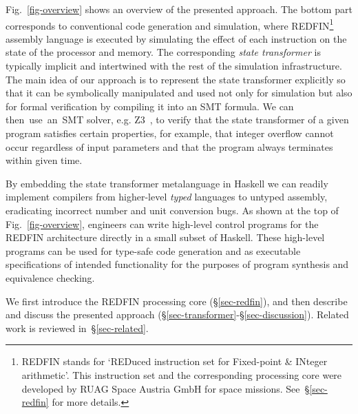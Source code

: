 Fig.~\ref{fig-overview} shows an overview of the presented approach. The bottom
part corresponds to conventional code generation and simulation, where
REDFIN\footnote{REDFIN stands for `REDuced instruction set for Fixed-point \&
INteger arithmetic'. This instruction set and the corresponding processing core
were developed by RUAG Space Austria GmbH for space missions.
See~\S\ref{sec-redfin} for more details.} assembly language is executed by
simulating the effect of each instruction on the state of the processor and memory.
The corresponding \emph{state transformer} is typically implicit and intertwined
with the rest of the simulation infrastructure. The main idea of our approach is
to represent the state transformer explicitly so that it can be symbolically
manipulated and used not only for simulation but also for formal verification by
compiling it into an SMT formula. We can then~use~an~SMT solver, e.g.
Z3~\cite{de2008z3}, to verify that the state transformer of a given program
satisfies certain properties, for example, that integer overflow cannot occur
regardless of input parameters and that the program always terminates within
given time.

By embedding the state transformer metalanguage in Haskell we can readily
implement compilers from higher-level \emph{typed} languages to untyped assembly,
eradicating incorrect number and unit conversion bugs. As shown at the top of
Fig.~\ref{fig-overview}, engineers can write high-level control
programs for the REDFIN architecture directly in a small subset of Haskell. These
high-level programs can be used for type-safe code generation and as executable
specifications of intended functionality for the purposes of program synthesis and
equivalence checking. %

We first introduce the REDFIN processing core (\S\ref{sec-redfin}), and then
describe and discuss the presented approach
(\S\ref{sec-transformer}-\S\ref{sec-discussion}). Related work is reviewed
in~\S\ref{sec-related}.

\clearpage